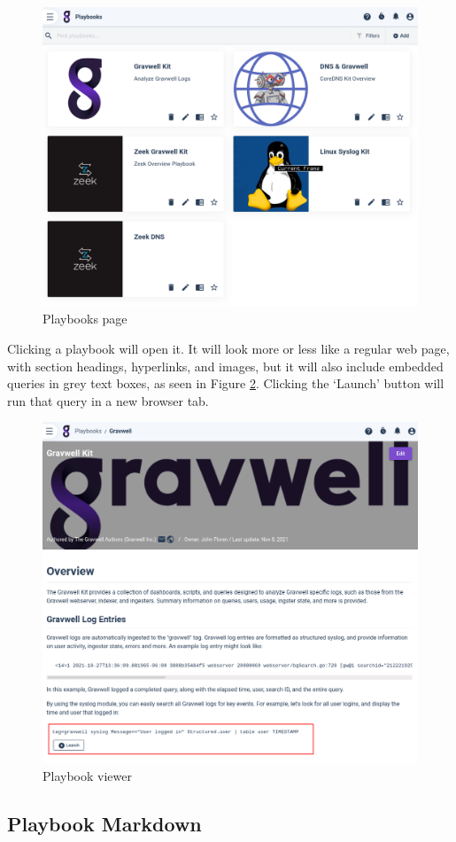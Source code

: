 \begin{figure}[H]
	\includegraphics[width=0.8\linewidth]{images/playbooks.png}
	\caption{Playbooks page}
	\label{fig:playbooks}
\end{figure}

Clicking a playbook will open it. It will look more or less like a regular web page, with section headings, hyperlinks, and images, but it will also include embedded queries in grey text boxes, as seen in Figure \ref{fig:playbook-read}. Clicking the `Launch' button will run that query in a new browser tab.

\begin{figure}[H]
	\includegraphics[width=0.8\linewidth]{images/playbook-read.png}
	\caption{Playbook viewer}
	\label{fig:playbook-read}
\end{figure}

\subsection{Playbook Markdown}

